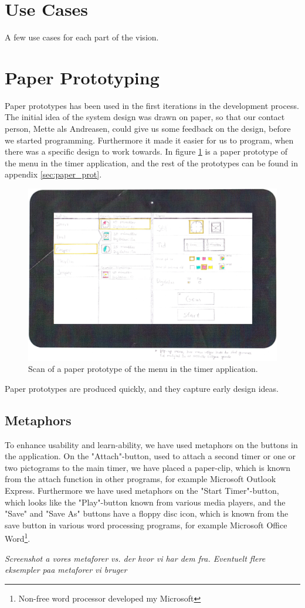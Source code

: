 \section{Use Cases}
A few use cases for each part of the vision.

\section{Paper Prototyping}
Paper prototypes\cite{misc:designInterSys} has been used in the first iterations in the development process. The initial idea of the system design was drawn on paper, so that our contact person, Mette als Andreasen, could give us some feedback on the design, before we started programming. Furthermore it made it easier for us to program, when there was a specific design to work towards. In figure \ref{fig:pap_prot_menu} is a paper prototype of the menu in the timer application, and the rest of the prototypes can be found in appendix \ref{sec:paper_prot}.

\begin{figure}[H]
	\centering
		\includegraphics[width=\textwidth]{Images/paper_prototype/menu.png}
			\caption{Scan of a paper prototype of the menu in the timer application.}
	\label{fig:pap_prot_menu}
\end{figure}

Paper prototypes are produced quickly, and they capture early design ideas.

\subsection{Metaphors}
To enhance usability and learn-ability, we have used metaphors\cite{misc:designInterSys} on the buttons in the application. On the "Attach"-button, used to attach a second timer or one or two pictograms to the main timer, we have placed a paper-clip, which is known from the attach function in other programs, for example Microsoft Outlook Express. Furthermore we have used metaphors on the "Start Timer"-button, which looks like the "Play"-button known from various media players, and the "Save" and "Save As" buttons have a floppy disc icon, which is known from the save button in various word processing programs, for example Microsoft Office Word\footnote{Non-free word processor developed my Microsoft}.



\textit{Screenshot a vores metaforer vs. der hvor vi har dem fra. Eventuelt flere eksempler paa metaforer vi bruger}